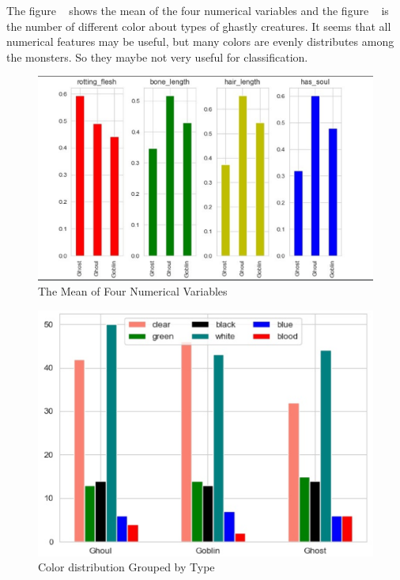 The figure ~ 
shows the mean of the four numerical variables  
and the figure ~ 
is the number of different color 
about types of ghastly creatures.
It seems that all numerical features may be useful, 
but many colors are evenly distributes among the monsters. 
So they maybe not very useful for classification.


\begin{figure}[htbp]
	\centering
	
	\includegraphics[scale=0.3]{figures/his_1.eps}
	\caption{The Mean of Four Numerical Variables}\label{fig:his_1}
\end{figure}


\begin{figure}[htbp]
	\centering
	
	\includegraphics[scale=0.3]{figures/his_2.eps}
	\caption{Color distribution Grouped by Type}\label{fig:his_2}
\end{figure}


